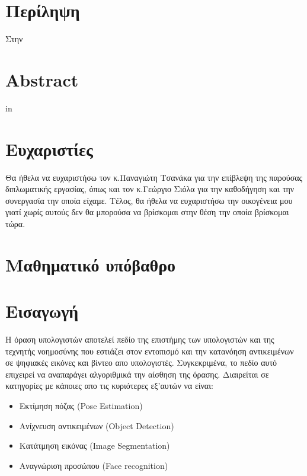 \documentclass[12pt]{article}
\begin{document}
\newpage
\mbox{}
\newpage

\section*{Περίληψη}
Στην


\newpage
\mbox{}
\newpage

\section*{Abstract}
in



\newpage
\mbox{}
\newpage

\section*{Ευχαριστίες}
Θα ήθελα να ευχαριστήσω τον κ.Παναγιώτη Τσανάκα για την επίβλεψη της παρούσας διπλωματικής εργασίας, όπως και τον κ.Γεώργιο Σιόλα για την καθοδήγηση και την συνεργασία την οποία είχαμε. Τέλος, θα ήθελα να ευχαριστήσω την οικογένεια μου γιατί χωρίς αυτούς δεν θα μπορούσα να βρίσκομαι στην θέση την οποία βρίσκομαι τώρα.


\newpage
\mbox{}
\newpage


\tableofcontents

\newpage
\listoffigures
{}

\newpage
\listoftables
{}

\newpage
{}
\section{Μαθηματικό υπόβαθρο}

\section{Εισαγωγή}

Η όραση υπολογιστών αποτελεί πεδίο της επιστήμης των υπολογιστών και της τεχνητής νοημοσύνης που εστιάζει στον εντοπισμό και την κατανόηση αντικειμένων σε ψηφιακές εικόνες και βίντεο απο υπολογιστές. Συγκεκριμένα, το πεδίο αυτό επιχειρεί να αναπαράγει αλγοριθμικά την αίσθηση της όρασης. Διαιρείται σε κατηγορίες με κάποιες απο τις κυριότερες εξ'αυτών να είναι: 

\begin{itemize}
    \item Εκτίμηση πόζας (Pose Estimation)
    \item Ανίχνευση αντικειμένων (Object Detection)
    \item Κατάτμηση εικόνας (Image Segmentation)
    \item Αναγνώριση προσώπου (Face recognition)
\end{itemize}
\end{document}

